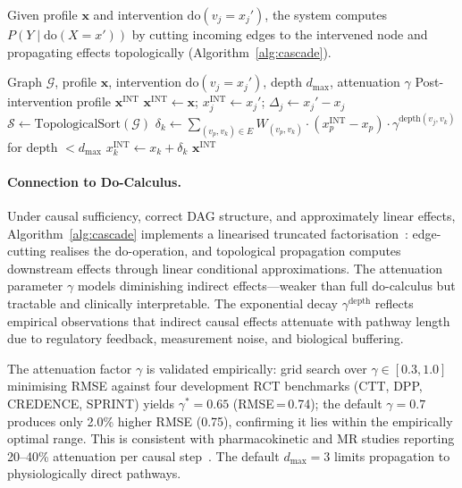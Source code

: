 \documentclass[runningheads]{llncs}
\begin{document}
Given profile $\mathbf{x}$ and intervention
$\mathrm{do}(v_j = x_j')$, the system computes
$P(Y \mid \mathrm{do}(X = x'))$ by cutting incoming edges to the
intervened node and propagating effects topologically
(Algorithm~\ref{alg:cascade}).

\begin{algorithm}[t]
\caption{Topological Intervention Cascade}
\label{alg:cascade}
\begin{algorithmic}[1]
\REQUIRE Graph $\mathcal{G}$, profile $\mathbf{x}$, intervention
  $\mathrm{do}(v_j = x_j')$, depth $d_{\max}$, attenuation $\gamma$
\ENSURE Post-intervention profile $\mathbf{x}^{\mathrm{INT}}$
\STATE $\mathbf{x}^{\mathrm{INT}} \leftarrow \mathbf{x}$;
  $x_j^{\mathrm{INT}} \leftarrow x_j'$;
  $\Delta_j \leftarrow x_j' - x_j$
\STATE $\mathcal{S} \leftarrow \text{TopologicalSort}(\mathcal{G})$
  \STATE $\delta_k \leftarrow \sum_{(v_p, v_k) \in E} W_{(v_p,v_k)} \cdot (x_p^{\mathrm{INT}} - x_p) \cdot \gamma^{\text{depth}(v_j,v_k)}$ for depth $< d_{\max}$
  \STATE $x_k^{\mathrm{INT}} \leftarrow x_k + \delta_k$
\ENDFOR
\RETURN $\mathbf{x}^{\mathrm{INT}}$
\end{algorithmic}
\end{algorithm}

\paragraph{Connection to Do-Calculus.}
Under causal sufficiency, correct DAG structure, and approximately
linear effects, Algorithm~\ref{alg:cascade} implements a linearised
truncated factorisation~\cite{pearl2009causality}: edge-cutting
realises the do-operation, and topological propagation computes
downstream effects through linear conditional approximations.
The attenuation parameter $\gamma$ models diminishing indirect
effects---weaker than full do-calculus but tractable and clinically
interpretable.
The exponential decay $\gamma^{\text{depth}}$ reflects empirical
observations that indirect causal effects attenuate with pathway
length due to regulatory feedback, measurement noise, and biological
buffering.

The attenuation factor $\gamma$ is validated empirically: grid
search over $\gamma \in [0.3, 1.0]$ minimising RMSE against four
development RCT benchmarks (CTT, DPP, CREDENCE, SPRINT) yields
$\gamma^* = 0.65$ (RMSE\,=\,0.74);
the default $\gamma = 0.7$ produces only 2.0\% higher RMSE
(0.75), confirming it lies within the empirically optimal range.
This is consistent with pharmacokinetic and MR studies reporting
20--40\% attenuation per causal
step~\cite{ctt2010,pearl2009causality}.
The default $d_{\max} = 3$ limits propagation to physiologically
direct pathways.
\end{document}
